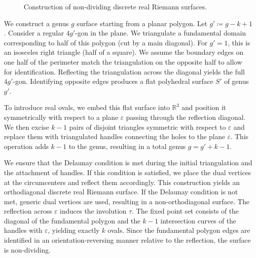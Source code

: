 \documentclass[11pt,a4paper]{article}
\theoremstyle{definition}
\begin{document}
\begin{figure}[htbp]
{
	}
	\caption{Construction of non-dividing discrete real Riemann surfaces.}
	\label{fig:non-dividing_0}
\end{figure}

We construct a genus $g$ surface starting from a planar polygon. Let $g' \coloneq g - k + 1$. Consider a regular $4g'$-gon in the plane. We triangulate a fundamental domain corresponding to half of this polygon (cut by a main diagonal). For $g'=1$, this is an isosceles right triangle (half of a square).
We assume the boundary edges on one half of the perimeter match the triangulation on the opposite half to allow for identification. Reflecting the triangulation across the diagonal yields the full $4g'$-gon. Identifying opposite edges produces a flat polyhedral surface $S'$ of genus $g'$.

To introduce real ovals, we embed this flat surface into $\mathds{R}^3$ and position it symmetrically with respect to a plane $\varepsilon$ passing through the reflection diagonal. We then excise $k-1$ pairs of disjoint triangles symmetric with respect to $\varepsilon$ and replace them with triangulated handles connecting the holes to the plane $\varepsilon$. This operation adds $k-1$ to the genus, resulting in a total genus $g = g' + k - 1$.

We ensure that the Delaunay condition is met during the initial triangulation and the attachment of handles. If this condition is satisfied, we place the dual vertices at the circumcenters and reflect them accordingly. This construction yields an orthodiagonal discrete real Riemann surface. If the Delaunay condition is not met, generic dual vertices are used, resulting in a non-orthodiagonal surface.
The reflection across $\varepsilon$ induces the involution $\tau$. The fixed point set consists of the diagonal of the fundamental polygon and the $k-1$ intersection curves of the handles with $\varepsilon$, yielding exactly $k$ ovals. Since the fundamental polygon edges are identified in an orientation-reversing manner relative to the reflection, the surface is non-dividing.
\end{document}
